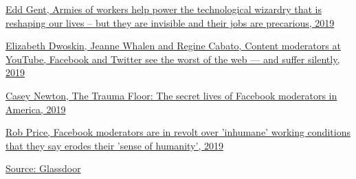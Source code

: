 \documentclass[12pt]{article}
\begin{document}
	\clearpage
	\begin{thebibliography}{}
		\footnotesize
		
		\href{https://www.bbc.com/worklife/article/20190829-the-ghost-work-powering-tech-magic}{Edd Gent, Armies of workers help power the technological wizardry that is reshaping our lives – but they are invisible and their jobs are precarious, 2019}
		
		\href{https://www.washingtonpost.com/technology/2019/07/25/social-media-companies-are-outsourcing-their-dirty-work-philippines-generation-workers-is-paying-price/}{Elizabeth Dwoskin, Jeanne Whalen and Regine Cabato, Content moderators at YouTube, Facebook and Twitter see the worst of the web — and suffer silently, 2019}
		
		\href{https://www.theverge.com/2019/2/25/18229714/cognizant-facebook-content-moderator-interviews-trauma-working-conditions-arizona}{Casey Newton, The Trauma Floor: The secret lives of Facebook moderators in America, 2019}
		
		\href{https://www.businessinsider.com/facebook-moderators-complain-big-brother-rules-accenture-austin-2019-2?r=DE\&IR=T}{Rob Price, Facebook moderators are in revolt over 'inhumane' working conditions that they say erodes their 'sense of humanity', 2019}
		
		\href{https://www.glassdoor.de/Bewertungen/Appen-Bewertungen-E667913.htm}{Source: Glassdoor}
		
	\end{thebibliography}
	
	
\end{document}
